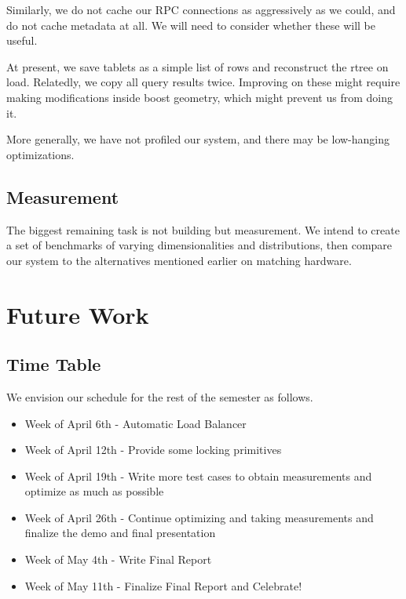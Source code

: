\documentclass[11pt]{article}
\begin{document}
Similarly, we do not cache our RPC connections as aggressively as we could, and do not cache metadata at all. We will need to consider whether these will be useful.

At present, we save tablets as a simple list of rows and reconstruct the rtree on load. Relatedly, we copy all query results twice. Improving on these might require making modifications inside boost geometry, which might prevent us from doing it.

More generally, we have not profiled our system, and there may be low-hanging optimizations.

\subsection{Measurement}

The biggest remaining task is not building but measurement. We intend to create a set of benchmarks of varying dimensionalities and distributions, then compare our system to the alternatives mentioned earlier on matching hardware.

\section{Future Work}

\subsection{Time Table}

We envision our schedule for the rest of the semester as follows.

\begin{itemize}
\item Week of April 6th - Automatic Load Balancer 
\item Week of April 12th - Provide some locking primitives
\item Week of April 19th - Write more test cases to obtain measurements and optimize as much as possible
\item Week of April 26th - Continue optimizing and taking measurements and finalize the demo and final presentation
\item Week of May 4th - Write Final Report
\item Week of May 11th - Finalize Final Report and Celebrate!


\end{itemize}
\end{document}
